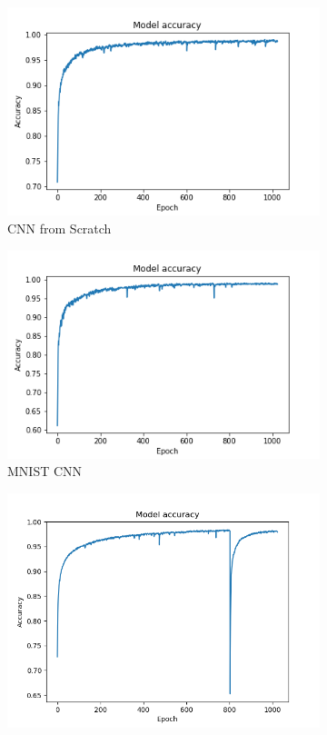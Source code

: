 \documentclass[a4paper,fleqn,usenatbib]{mnras}
\begin{document}
\begin{figure}

 \begin{subfigure}{\columnwidth}
 \includegraphics[width=\columnwidth]{../Figures/CNN_self} 
 \caption{CNN from Scratch}
 \label{fig:CNN_self}
 \end{subfigure}
 \begin{subfigure}{\columnwidth}
 \includegraphics[width=\columnwidth]{../Figures/CNN_MNIST}
 \caption{MNIST CNN}
 \label{fig:CNN_MNIST}
 \end{subfigure}
 \begin{subfigure}{\columnwidth}
 \includegraphics[width=\columnwidth]{../Figures/CNN_Augment_Self}

\end{subfigure}
\end{figure}
\end{document}
